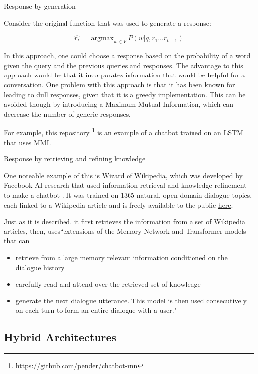 \documentclass[10pt]{beamer}
\DeclareMathOperator*{\argmax}{argmax} %
\begin{document}
\begin{frame}{Response by generation}

Consider the original function that was used to generate a response:

\[
\hat{r_t} = \argmax_{w\in V} P(w|q, r_1...r_{t - 1})
\]

In this approach, one could choose a response based on the probability of a word given the query and the previous queries and responses.  The advantage to this approach would be that it incorporates information that would be helpful for a conversation.  One problem with this approach is that it has been known for leading to dull responses, given that it is a greedy implementation.  This can be avoided though by introducing a Maximum Mutual Information, which can decrease the number of generic responses.

For example, this repository \footnote{https://github.com/pender/chatbot-rnn} is an example of a chatbot trained on an LSTM that uses MMI.

\end{frame}

\begin{frame}{Response by retrieving and refining knowledge}

One noteable example of this is Wizard of Wikipedia, which was developed by Facebook AI research that used information retrieval and knowledge refinement to make a chatbot \cite{wiki}.  It was trained on 1365 natural, open-domain dialogue topics, each linked to a Wikipedia article and is freely available to the public \href{https://github.com/facebookresearch/ParlAI/tree/main/projects/wizard_of_wikipedia}{here}.  

Just as it is described, it first retrieves the information from a set of Wikipedia articles, then, uses``extensions of the Memory Network and Transformer models that can 
\begin{itemize}
    \item retrieve from a
large memory relevant information conditioned on the dialogue history
\item carefully read and attend
over the retrieved set of knowledge
\item generate the next dialogue utterance. This model
is then used consecutively on each turn to form an entire dialogue with a user."
\end{itemize}
\end{frame}

\subsection{Hybrid Architectures}
\end{document}
